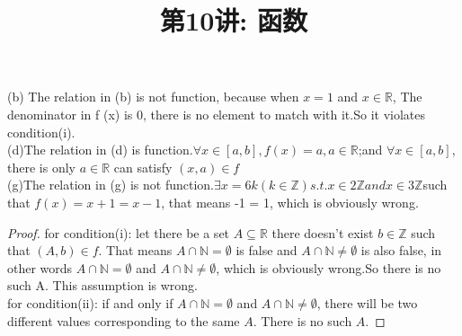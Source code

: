 \documentclass[a4paper, justified]{tufte-handout}
\title{第10讲: 函数}
\date{\zhtoday} %
\begin{document}
\maketitle
\noplagiarism %
\begin{abstract}
	\begin{center}{}
	\end{center}
\end{abstract}
\beginrequired

\begin{problem}[UD Problem 14.3 (b, d, g)]
\end{problem}

\begin{solution}
	(b) The relation in (b) is not function, because when $x = 1$ and $x \in \mathbb{R} $, The denominator in f (x) is 0, there is no element to match with it.So it violates condition(i).\\
	(d)The relation in (d) is function.$\forall x \in [a, b], f(x) = a, a \in \mathbb{R}$;and $ \forall x \in [a, b]$, there is only $a\in \mathbb{R}$ can satisfy $(x, a) \in f$\\
	(g)The relation in (g) is not function.$\exists x = 6k(k \in \mathbb{Z} ) s.t. x \in 2\mathbb{Z} and x \in 3\mathbb{Z} $such that $f(x) = x + 1 = x - 1$, that means -1 = 1, which is obviously wrong.
\end{solution}

\begin{problem}[UD Problem 14.5]
\end{problem}

\begin{proof}
	for condition(i): let there be a set $A \subseteq \mathbb{R} $ there doesn't exist $b \in \mathbb{Z} $ such that $(A, b) \in f$. That means $A \cap \mathbb{N} = \emptyset$ is false and $A \cap \mathbb{N} \neq  \emptyset$ is also false, in other words $A \cap \mathbb{N} = \emptyset$ and $A \cap \mathbb{N} \neq  \emptyset$, which is obviously wrong.So there is no such A. This assumption is wrong.\\
	for condition(ii): if and only if $A \cap \mathbb{N} = \emptyset$ and $A \cap \mathbb{N} \neq  \emptyset$, there will be two different values corresponding to the same $A$. There is no such $A$.
\end{proof}
\end{document}
